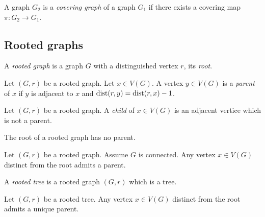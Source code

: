 \begin{definition}
  \label{def:covering_graph}
  A graph $G_2$ is a \emph{covering graph} of a graph $G_1$ if there exists
  a covering map $\pi : G_2 \rightarrow G_1$.
\end{definition}

\subsection{Rooted graphs}

\begin{definition}
  \label{def:rooted_graph}
  A \emph{rooted graph} is a graph $G$ with a distinguished vertex $r$, its \emph{root}.
\end{definition}

\begin{definition}
  \label{def:rooted_graph_parent}
  Let $(G,r)$ be a rooted graph.
  Let $x \in V(G)$.
  A vertex $y \in V(G)$ is a \emph{parent} of $x$ if $y$ is adjacent to $x$ and $\mathrm{dist}(r,y) = \mathrm{dist}(r,x)-1$.
\end{definition}


\begin{definition}
  \label{def:rooted_graph_child}
  Let $(G,r)$ be a rooted graph.
  A \emph{child} of $x \in V(G)$ is an adjacent vertice which is not a parent.
\end{definition}

\begin{lemma}
  \label{lem:root_no_parent}
  The root of a rooted graph has no parent.
\end{lemma}

\begin{lemma}
  \label{lem:exists_parent}
  Let $(G,r)$ be a rooted graph. Assume $G$ is connected.
  Any vertex $x \in V(G)$ distinct from the root admits a parent.
\end{lemma}

\begin{definition}
  \label{def:rooted_tree}
  A \emph{rooted tree} is a rooted graph $(G,r)$ which is a tree.
\end{definition}

\begin{proposition}
  \label{prop:rooted_tree_unique_parent}
  Let $(G,r)$ be a rooted tree.
  Any vertex $x \in V(G)$ distinct from the root admits a unique parent.
\end{proposition}


